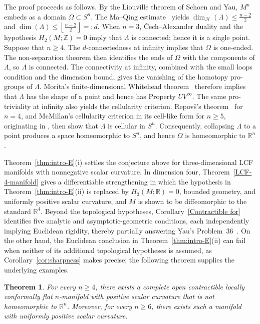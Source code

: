 \documentclass[12pt,oneside,a4paper]{article}
\newtheorem{theoremF}{Theorem}
\theoremstyle{mytheorem}
\theoremstyle{remark}
\theoremstyle{definition}
\begin{document}
The proof proceeds as follows. By the Liouville theorem of Schoen and Yau,
\(M^n\) embeds as a domain \(\Omega\subset S^n\). The Ma--Qing
estimate~\cite[Theorem~1.3]{zbMATH08016940} yields
$\dim_{\mathcal H}(\Lambda)\leq\frac{n-2}{2}$ and
$\dim(\Lambda)\leq\left\lfloor\frac{n-2}{2}\right\rfloor=:d.$
When \(n=3\), \v{C}ech--Alexander duality and the hypothesis
\(H_2(M;\mathbb Z)=0\) imply that \(\Lambda\) is connected; hence it is a
single point. Suppose that \(n\geq4\). The \(d\)-connectedness at infinity
implies that \(\Omega\) is one-ended. The non-separation theorem then
identifies the ends of \(\Omega\) with the components of \(\Lambda\), so
\(\Lambda\) is connected. The connectivity at infinity, combined with the
small loops condition and the dimension bound, gives the vanishing of the
homotopy pro-groups of \(\Lambda\). Morita's
finite-dimensional Whitehead theorem~\cite[Theorem~1.2, p.~394]{zbMATH03497097}
therefore implies that \(\Lambda\) has the shape of a point and hence has
Property \(UV^\infty\). The same pro-triviality at infinity also yields the
cellularity criterion. Repov\v{s}'s
theorem~\cite[Theorem, p.~564]{zbMATH04011439} for \(n=4\), and McMillan's
cellularity criterion in its cell-like form
\cite[Theorem~3.2.3, p.~107]{zbMATH05624618} for \(n\geq5\), originating in
\cite[Theorem~1, p.~327]{zbMATH03190942}, then show that \(\Lambda\) is
cellular in \(S^n\). Consequently, collapsing \(\Lambda\) to a point produces
a space homeomorphic to \(S^n\), and hence \(\Omega\) is homeomorphic to
\(\mathbb R^n\).

Theorem~\ref{thm:intro-E}(i) settles the conjecture above for three-dimensional LCF
manifolds with nonnegative scalar curvature.  In dimension four,
Theorem~\ref{LCF-4-manifold} gives a differentiable strengthening in
which the hypothesis in Theorem~\ref{thm:intro-E}(ii) is replaced by
\(H_3(M;\mathbb R)=0\), bounded geometry, and uniformly positive scalar
curvature, and \(M\) is shown to be diffeomorphic to the standard
\(\mathbb R^4\). Beyond the
topological hypotheses, Corollary~\ref{Contractible for} identifies five
analytic and asymptotic-geometric conditions, each independently
implying Euclidean rigidity, thereby partially answering Yau's
Problem~36~\cite[Problem~36]{MR1216573}. On the other hand, the
Euclidean conclusion in Theorem~\ref{thm:intro-E}\textup{(ii)} can fail when neither of its additional
topological hypotheses is assumed, as Corollary~\ref{cor:sharpness} makes
precise; the following theorem supplies the underlying examples.

\begin{theoremF}\label{F}
For every $n\geq 4$, there exists a complete open contractible locally conformally flat
$n$-manifold with positive scalar curvature that is not homeomorphic to
$\mathbb{R}^n$. Moreover, for every $n\geq 6$, there exists such a manifold
with uniformly positive scalar curvature.
\end{theoremF}
\end{document}

